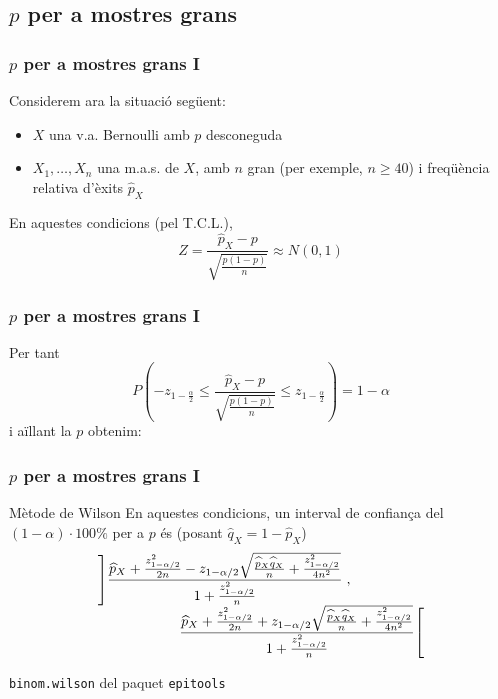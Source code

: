 \documentclass[12pt,t]{beamer}
\renewcommand{\leq}{\leqslant}
\renewcommand{\geq}{\geqslant}
\theoremstyle{plain}
\theoremstyle{definition}
\begin{document}
\subsection{$p$ per a mostres grans}


\begin{frame}
\frametitle{$p$ per a mostres grans I}

Considerem ara la situació següent:
\begin{itemize}
\item  $X$ una v.a. Bernoulli amb $p$ desconeguda

\item $X_1,\ldots,X_n$ una m.a.s. de $X$, amb $n$  gran (per exemple, $n\geq 40$) i freqüència relativa d'èxits $\widehat{p}_{X}$
\end{itemize}
\medskip

En aquestes condicions (pel T.C.L.), 
$$
Z=\dfrac{\widehat{p}_{X}-p}
{\sqrt{\frac{p(1-p)}{n}}}\approx N(0,1)
$$
\end{frame}


\begin{frame}
\frametitle{$p$ per a mostres grans I}
Per tant
$$
P\left(-z_{1-\frac{\alpha}{2}}\leq \dfrac{\widehat{p}_{X}-p}
{\sqrt{\frac{p(1-p)}{n}}}\leq z_{1-\frac{\alpha}{2}}\right)=1-\alpha
$$
i aïllant la $p$ obtenim:
\end{frame}


\begin{frame}
\frametitle{$p$ per a mostres grans I}
\begin{block}{Mètode de Wilson}
En aquestes condicions, un interval  de confiança del $(1-\alpha)\cdot 100\%$ per a $p$
és  (posant $\widehat{q}_{X}=1-\widehat{p}_{X}$)
$$
\begin{array}{l}
\displaystyle \left]\frac{\widehat{p}_{X}+\frac{z_{1-{\alpha}/{2}}^2}{2n}-z_{1-{\alpha}/{2}}\sqrt{\frac{\widehat{p}_{X}\widehat{q}_{X}}{n}+\frac{z_{1-{\alpha}/{2}}^2}{4n^2}}}{1+\frac{z_{1-{\alpha}/{2}}^2}{n}}\right.,\\[2ex]
\hspace*{2cm} \displaystyle \left.\frac{\widehat{p}_{X}+\frac{z_{1-{\alpha}/{2}}^2}{2n}+z_{1-{\alpha}/{2}}\sqrt{\frac{\widehat{p}_{X}\widehat{q}_{X}}{n}+\frac{z_{1-{\alpha}/{2}}^2}{4n^2}}}{1+\frac{z_{1-{\alpha}/{2}}^2}{n}}\right[
\end{array}
$$
\end{block}
\medskip

\texttt{binom.wilson} del paquet \texttt{epitools}

\end{frame}
\end{document}
